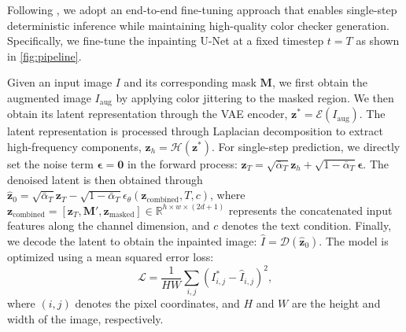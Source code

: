 Following \cite{garcia2024fine}, we adopt an end-to-end fine-tuning approach that enables single-step deterministic inference while maintaining high-quality color checker generation. Specifically, we fine-tune the inpainting U-Net at a fixed timestep $t = T$ as shown in \cref{fig:pipeline}. 
% 
{Given an input image $I$ and its corresponding mask $\mathbf{M}$, we first obtain the augmented image $I_{\text{aug}}$ by applying color jittering to the masked region. We then obtain its latent representation through the VAE encoder, $\mathbf{z}^* = \mathcal{E}(I_{\text{aug}})$. The latent representation is processed through Laplacian decomposition to extract high-frequency components, $\mathbf{z}_h = \mathcal{H}(\mathbf{z}^*)$. For single-step prediction, we directly set the noise term $\boldsymbol{\epsilon} = \mathbf{0}$ in the forward process: $\mathbf{z}_T = \sqrt{\bar{\alpha}_T}\mathbf{z}_h + \sqrt{1-\bar{\alpha}_T}\boldsymbol{\epsilon}$. The denoised latent is then obtained through $\hat{\mathbf{z}}_0 = \sqrt{\bar{\alpha}_T}\mathbf{z}_T - \sqrt{1-\bar{\alpha}_T}\epsilon_\theta(\mathbf{z}_{\text{combined}}, T, c)$, where $\mathbf{z}_{\text{combined}} = [\mathbf{z}_T, \mathbf{M}', \mathbf{z}_{\text{masked}}] \in \mathbb{R}^{h \times w \times (2d+1)}$ represents the concatenated input features along the channel dimension, and $c$ denotes the text condition. Finally, we decode the latent to obtain the inpainted image: $\hat{I} = \mathcal{D}(\hat{\mathbf{z}}_0)$. The model is optimized using a mean squared error loss:
% 
\begin{equation}
\mathcal{L} = \frac{1}{HW}\sum_{i,j} (I^*_{i,j} - \hat{I}_{i,j})^2, 
\end{equation}
where $(i,j)$ denotes the pixel coordinates, and $H$ and $W$ are the height and width of the image, respectively.

}
